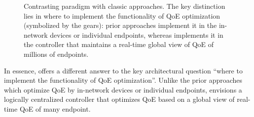 \begin{figure}[t!]
\captionsetup[subfigure]{justification=centering,farskip=-1pt,captionskip=5pt}
\centering
\caption{Contrasting \ddn paradigm with classic approaches. 
The key distinction lies in where to implement the functionality of QoE optimization 
(symbolized by the gears): prior approaches implement 
it in the in-network devices or individual endpoints, whereas \ddn implements 
it in the controller that maintains a real-time global view of QoE of millions of endpoints.}
\vspace{-0.1cm}
\label{fig:intro:contrast}
\end{figure}


In essence, \ddn offers a different answer to the key architectural question 
``where to implement the functionality of QoE optimization''.
Unlike the prior approaches which 
optimize QoE by in-network devices or individual endpoints, 
\ddn envisions a logically centralized controller that optimizes QoE based on 
a global view of real-time QoE of many endpoint.


